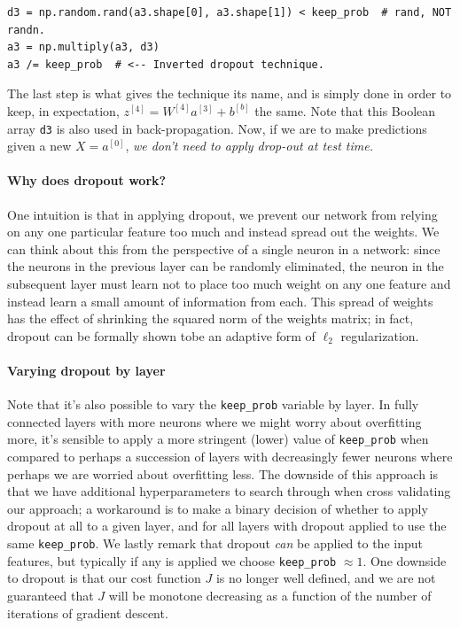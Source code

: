 \documentclass[12pt]{article}
\begin{document}
\begin{verbatim} 
d3 = np.random.rand(a3.shape[0], a3.shape[1]) < keep_prob  # rand, NOT randn.
a3 = np.multiply(a3, d3)
a3 /= keep_prob  # <-- Inverted dropout technique.
\end{verbatim}
The last step is what gives the technique its name, and is 
simply done in order to keep, in expectation, $z^{[4]} = W^{[4]} a^{[3]} + b^{[b]}$ the same. Note that this Boolean array \texttt{d3} is also used in back-propagation. 
Now, if we are to make predictions given a new $X = a^{[0]}$, \emph{we don't need to   apply drop-out at test time.}

\paragraph{Why does dropout work?} One intuition is that in applying dropout, we prevent our network from relying on any one particular feature too much and instead spread out the weights. We can think about this from the perspective of a single neuron in a network: since the neurons in the previous layer can be randomly eliminated, the neuron in the subsequent layer must learn not to place too much weight on any one feature and instead learn a small amount of information from each. This spread of weights has the effect of shrinking the squared norm of the weights matrix; in fact, dropout can be formally shown tobe an adaptive form of $\ell_2$ regularization.

\paragraph{Varying dropout by layer}
Note that it's also possible to vary the \texttt{keep\_prob} variable by layer. In fully connected layers with more neurons where we might worry about overfitting more, it's sensible to apply a more stringent (lower) value of \texttt{keep\_prob} when compared to perhaps a succession of layers with decreasingly fewer neurons where perhaps we are worried about overfitting less. The downside of this approach is that we have additional hyperparameters to search through when cross validating our approach; a workaround is to make a binary decision of whether to apply dropout at all to a given layer, and for all layers with dropout applied to use the same \texttt{keep\_prob}. We lastly remark that dropout \emph{can} be applied to the input features, but typically if any is applied we choose \texttt{keep\_prob} $\approx 1$.
One downside to dropout is that our cost function $J$ is no longer well defined, and we are not guaranteed that $J$ will be monotone decreasing as a function of the number of iterations of gradient descent.
\end{document}
